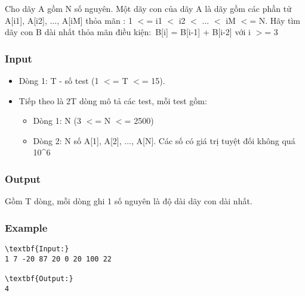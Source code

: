 

Cho dãy A gồm N số nguyên. Một dãy con của dãy A là dãy gồm các phần tử A[i1], A[i2], ..., A[iM] thỏa mãn : 1 $<$= i1 $<$ i2 $<$ ... $<$ iM $<$= N. Hãy tìm dãy con B dài nhất thỏa mãn điều kiện: B[i] = B[i-1] + B[i-2] với i $>$= 3

\subsubsection{Input}
\begin{itemize}
	\item Dòng 1: T - số test (1 $<$= T $<$= 15).
	\item Tiếp theo là 2T dòng mô tả các test, mỗi test gồm:
\begin{itemize}
	\item Dòng 1: N (3 $<$= N $<$= 2500)
	\item Dòng 2: N số A[1], A[2], ..., A[N]. Các số có giá trị tuyệt đối không quá 10\textasciicircum6
\end{itemize}
\end{itemize}

\subsubsection{Output}

Gồm T dòng, mỗi dòng ghi 1 số nguyên là độ dài dãy con dài nhất.

\subsubsection{Example}
\begin{verbatim}
\textbf{Input:}
1 7 -20 87 20 0 20 100 22

\textbf{Output:}
4\end{verbatim}